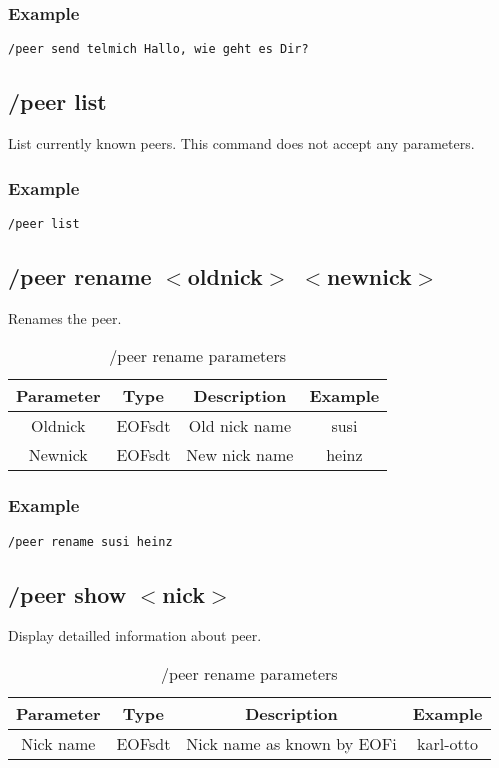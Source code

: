 \documentclass[12pt,a4paper]{book}
\begin{document}
\subsubsection{Example}
\begin{verbatim}
/peer send telmich Hallo, wie geht es Dir?
\end{verbatim}
\subsection{/peer list}
List currently known peers. This command does not accept any parameters.

\subsubsection{Example}
\begin{verbatim}
/peer list
\end{verbatim}
\subsection{/peer rename $<$oldnick$>$ $<$newnick$>$}
Renames the peer.
%
\begin{longtable}{|c|c|c|c|}
\caption{/peer rename parameters}\\
\hline
\textbf{Parameter} & \textbf{Type} & \textbf{Description} & \textbf{Example}\\
\hline
Oldnick & EOFsdt & Old nick name & susi\\
\hline
Newnick & EOFsdt & New nick name & heinz\\
\hline
\end{longtable}

\subsubsection{Example}
\begin{verbatim}
/peer rename susi heinz
\end{verbatim}
\subsection{/peer show $<$nick$>$}
Display detailled information about peer.
%
\begin{longtable}{|c|c|c|c|}
\caption{/peer rename parameters}\\
\hline
\textbf{Parameter} & \textbf{Type} & \textbf{Description} & \textbf{Example}\\
\hline
Nick name & EOFsdt & Nick name as known by EOFi & karl-otto\\
\hline
\end{longtable}
\end{document}
